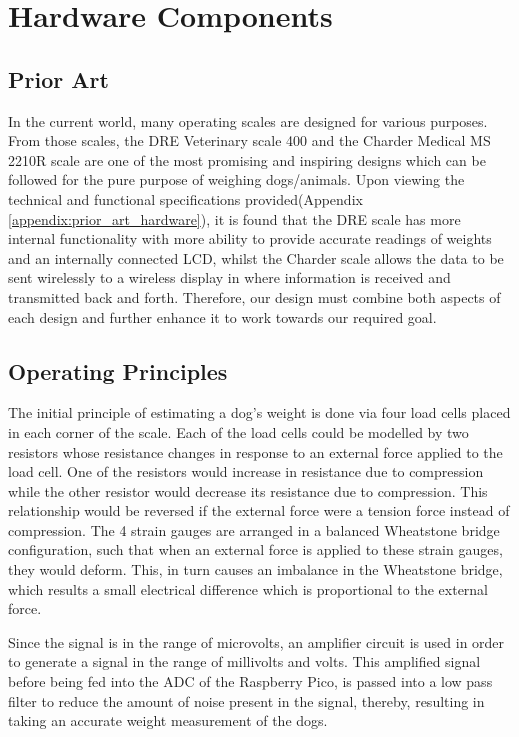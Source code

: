 
\chapter{Hardware Components}

\section{Prior Art}
In the current world, many operating scales are designed for various purposes. From those scales, the DRE Veterinary scale 400 and the Charder Medical MS 2210R scale are one of the most promising and inspiring designs which can be followed for the pure purpose of weighing dogs/animals. Upon viewing the technical and functional specifications provided(Appendix \ref{appendix:prior_art_hardware}), it is found that the DRE scale has more internal functionality with more ability to provide accurate readings of weights and an internally connected LCD, whilst the Charder scale allows the data to be sent wirelessly to a wireless display in where information is received and transmitted back and forth. Therefore, our design must combine both aspects of each design and further enhance it to work towards our required goal.


\section{Operating Principles}
The initial principle of estimating a dog's weight is done via four load cells placed in each corner of the scale. Each of the load cells could be modelled by two resistors whose resistance changes in response to an external force applied to the load cell. One of the resistors would increase in resistance due to compression while the other resistor would decrease its resistance due to compression. This relationship would be reversed if the external force were a tension force instead of compression.
The 4 strain gauges are arranged in a balanced Wheatstone bridge configuration, such that when an external force is applied to these strain gauges, they would deform. This, in turn causes an imbalance in the Wheatstone bridge, which results a small electrical difference which is proportional to the external force.

Since the signal is in the range of microvolts, an amplifier circuit is used in order to generate a  signal in the range of millivolts and volts. This amplified signal before being fed into the ADC of the Raspberry Pico, is passed into a low pass filter to reduce the amount of noise present in the signal, thereby, resulting in taking an accurate weight measurement of the dogs.

